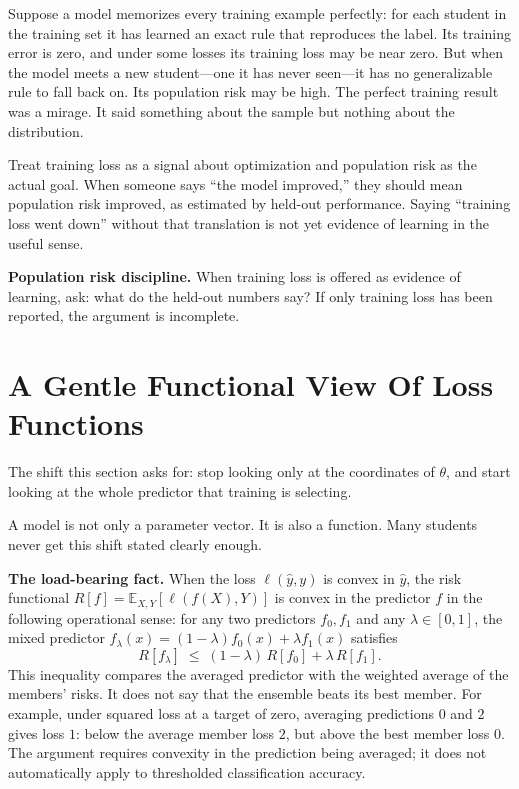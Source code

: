\begin{example}
Suppose a model memorizes every training example perfectly: for each student in the training set it has learned an exact rule that reproduces the label. Its training error is zero, and under some losses its training loss may be near zero. But when the model meets a new student---one it has never seen---it has no generalizable rule to fall back on. Its population risk may be high. The perfect training result was a mirage. It said something about the sample but nothing about the distribution.
\end{example}

Treat training loss as a signal about optimization and population risk as the actual goal. When someone says ``the model improved,'' they should mean population risk improved, as estimated by held-out performance. Saying ``training loss went down'' without that translation is not yet evidence of learning in the useful sense.

\textbf{Population risk discipline.} When training loss is offered as evidence of learning, ask: what do the held-out numbers say? If only training loss has been reported, the argument is incomplete.

\section*{A Gentle Functional View Of Loss Functions}

The shift this section asks for: stop looking only at the coordinates of \(\theta\), and start looking at the whole predictor that training is selecting.

A model is not only a parameter vector. It is also a function. Many students never get this shift stated clearly enough.

\textbf{The load-bearing fact.} When the loss $\ell(\hat y, y)$ is convex in $\hat y$, the risk functional $R[f] = \mathbb{E}_{X,Y}[\ell(f(X), Y)]$ is convex in the predictor $f$ in the following operational sense: for any two predictors $f_0, f_1$ and any $\lambda \in [0, 1]$, the mixed predictor $f_\lambda(x) = (1-\lambda) f_0(x) + \lambda f_1(x)$ satisfies
\[
R[f_\lambda] \;\le\; (1-\lambda)\, R[f_0] + \lambda\, R[f_1].
\]
This inequality compares the averaged predictor with the weighted average of the members' risks. It does not say that the ensemble beats its best member. For example, under squared loss at a target of zero, averaging predictions $0$ and $2$ gives loss $1$: below the average member loss $2$, but above the best member loss $0$. The argument requires convexity in the prediction being averaged; it does not automatically apply to thresholded classification accuracy.

